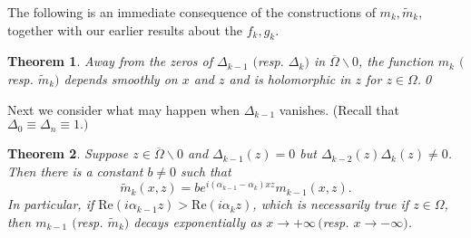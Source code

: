 \documentclass{surv-l}
\theoremstyle{plain}
\newtheorem{theorem}{Theorem}[section]
\theoremstyle{definition}
\numberwithin{equation}{chapter}
\begin{document}
The following is an immediate consequence of the constructions of $m_{k},\tilde{m}_{k}$, together with our earlier results about the $f_{k}, g_{k}$.

\begin{theorem}\label{thm7.26}
Away from the zeros of $\Delta_{k-1}$ $($resp. $\Delta_{k})$ in $\overline{\Omega}\backslash 0$, the function $m_{k}$ $($resp. $\tilde{m}_{k})$ depends smoothly on $x$ and $z$ and is holomorphic in $z$ for $ z\in\Omega$.\qed
\end{theorem}

Next we consider what may happen when $\Delta_{k-1}$ vanishes. (Recall that $\Delta_{0}\equiv \Delta_{n}\equiv 1.)$

\begin{theorem}\label{thm7.27}
Suppose $z\in\overline{\Omega}\backslash 0$ and $\Delta_{k-1}(z)=0$ but $\Delta_{k-2}(z)\Delta_{k}(z)\neq 0$. Then there is a constant $b\neq 0$ such that
\setcounter{equation}{27}
\begin{equation}
\tilde{m}_{k}(x, z)=be^{i(\alpha_{k-1}-\alpha_{k})xz}m_{k-1}(x, z).
\end{equation}
In particular, if $\mathrm{Re}(i\alpha_{k-1}z)>\mathrm{Re}(i\alpha_{k}z)$, which is necessarily true if $ z\in\Omega$, then $m_{k-1}$ $($resp. $\tilde{m}_{k})$ decays exponentially as $ x\rightarrow+\infty\,($resp. $x\rightarrow-\infty)$.
\end{theorem}
\end{document}

